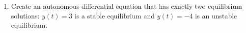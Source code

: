\clearpage


\begin{enumerate}[resume]





\item Create an autonomous differential equation that has exactly two equilibrium solutions: $y(t)=3$ is a stable equilibrium and $y(t) = -4$ is an unstable equilibrium.

\end{enumerate}
